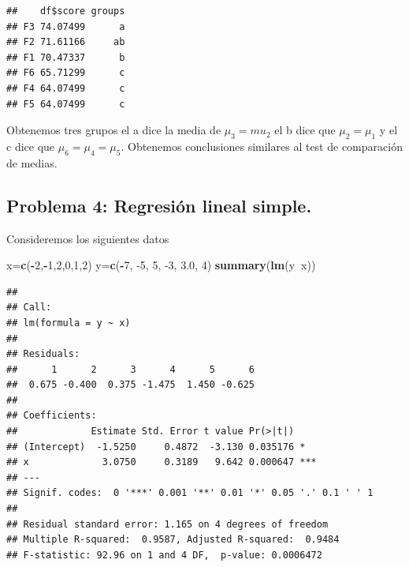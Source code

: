 \documentclass[
]{article}
\newenvironment{Shaded}{\begin{snugshade}}{\end{snugshade}}
\newcommand{\DecValTok}[1]{\textcolor[rgb]{0.00,0.00,0.81}{#1}}
\newcommand{\FloatTok}[1]{\textcolor[rgb]{0.00,0.00,0.81}{#1}}
\newcommand{\KeywordTok}[1]{\textcolor[rgb]{0.13,0.29,0.53}{\textbf{#1}}}
\newcommand{\NormalTok}[1]{#1}
\newcommand{\OperatorTok}[1]{\textcolor[rgb]{0.81,0.36,0.00}{\textbf{#1}}}
\begin{document}
\begin{verbatim}
##    df$score groups
## F3 74.07499      a
## F2 71.61166     ab
## F1 70.47337      b
## F6 65.71299      c
## F4 64.07499      c
## F5 64.07499      c
\end{verbatim}

Obtenemos tres grupos el a dice la media de \(\mu_3=mu_2\) el b dice que
\(\mu_2=\mu_1\) y el c dice que \(\mu_6=\mu_4=\mu_5\). Obtenemos
conclusiones similares al test de comparación de medias.

\hypertarget{problema-4-regresiuxf3n-lineal-simple.}{%
\subsection{Problema 4: Regresión lineal
simple.}\label{problema-4-regresiuxf3n-lineal-simple.}}

Consideremos los siguientes datos

\begin{Shaded}
\begin{Highlighting}[]
\NormalTok{x=}\KeywordTok{c}\NormalTok{(}\OperatorTok{-}\DecValTok{2}\NormalTok{,}\OperatorTok{-}\DecValTok{1}\NormalTok{,}\DecValTok{2}\NormalTok{,}\DecValTok{0}\NormalTok{,}\DecValTok{1}\NormalTok{,}\DecValTok{2}\NormalTok{)}
\NormalTok{y=}\KeywordTok{c}\NormalTok{(}\OperatorTok{-}\DecValTok{7}\NormalTok{, }\DecValTok{-5}\NormalTok{,  }\DecValTok{5}\NormalTok{, }\DecValTok{-3}\NormalTok{,  }\FloatTok{3.0}\NormalTok{,  }\DecValTok{4}\NormalTok{)}
\KeywordTok{summary}\NormalTok{(}\KeywordTok{lm}\NormalTok{(y}\OperatorTok{~}\NormalTok{x))}
\end{Highlighting}
\end{Shaded}

\begin{verbatim}
## 
## Call:
## lm(formula = y ~ x)
## 
## Residuals:
##      1      2      3      4      5      6 
##  0.675 -0.400  0.375 -1.475  1.450 -0.625 
## 
## Coefficients:
##             Estimate Std. Error t value Pr(>|t|)    
## (Intercept)  -1.5250     0.4872  -3.130 0.035176 *  
## x             3.0750     0.3189   9.642 0.000647 ***
## ---
## Signif. codes:  0 '***' 0.001 '**' 0.01 '*' 0.05 '.' 0.1 ' ' 1
## 
## Residual standard error: 1.165 on 4 degrees of freedom
## Multiple R-squared:  0.9587, Adjusted R-squared:  0.9484 
## F-statistic: 92.96 on 1 and 4 DF,  p-value: 0.0006472
\end{verbatim}
\end{document}
